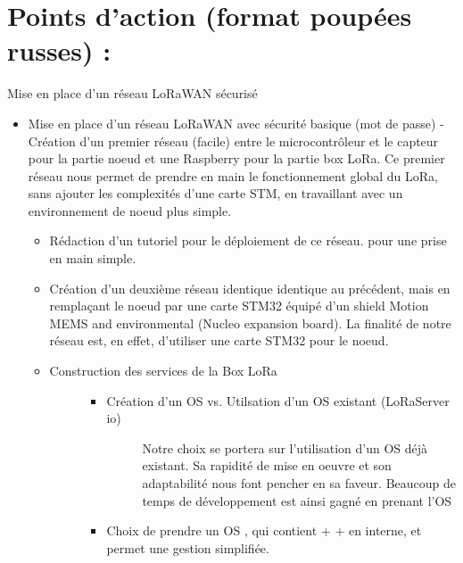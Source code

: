 \documentclass[letterpaper,10pt,french]{sphinxmanual}
\begin{document}
\chapter{Points d’action (format poupées russes) :}
\label{\detokenize{specifications:points-daction-format-poupees-russes}}
Mise en place d’un réseau LoRaWAN sécurisé
\begin{itemize}
\item {} 
Mise en place d’un réseau LoRaWAN avec sécurité basique (mot de passe)
- Création d’un premier réseau (facile) entre le microcontrôleur  et le capteur  pour la partie noeud et une Raspberry pour la partie box LoRa. Ce premier réseau nous permet de prendre en main le fonctionnement global du LoRa, sans ajouter les complexités d’une carte STM, en travaillant avec un environnement de noeud plus simple.
\begin{itemize}
\item {} 
Rédaction d’un tutoriel pour le déploiement de ce réseau.  pour une prise en main simple.

\end{itemize}
\begin{itemize}
\item {} 
Création d’un deuxième réseau identique identique au précédent, mais en remplaçant le noeud par une carte STM32 équipé d’un shield Motion MEMS and environmental (Nucleo expansion board). La finalité de notre réseau est, en effet, d’utiliser une carte STM32 pour le noeud.

\item {} \begin{description}
\item[{Construction des services de la Box LoRa}] \leavevmode\begin{itemize}
\item {} \begin{description}
\item[{Création d’un OS vs. Utilsation d’un OS existant (LoRaServer io)}] \leavevmode
Notre choix se portera sur l’utilisation d’un OS déjà existant. Sa rapidité de mise en oeuvre et son adaptabilité nous font pencher en sa faveur. Beaucoup de temps de développement est ainsi gagné en prenant l’OS 

\end{description}

\item {} 
Choix de prendre un OS , qui contient  +  +  en interne, et permet une gestion simplifiée.


\end{itemize}
\end{description}
\end{itemize}
\end{itemize}
\end{document}
